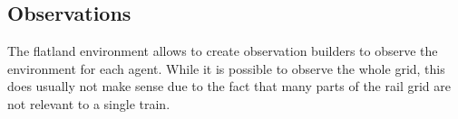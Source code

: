 \subsection*{Observations}\label{observations}
The flatland environment allows to create observation builders to observe the environment for each agent. While it is possible to observe the whole grid, this does usually not make sense due to the fact that many parts of the rail grid are not relevant to a single train.

